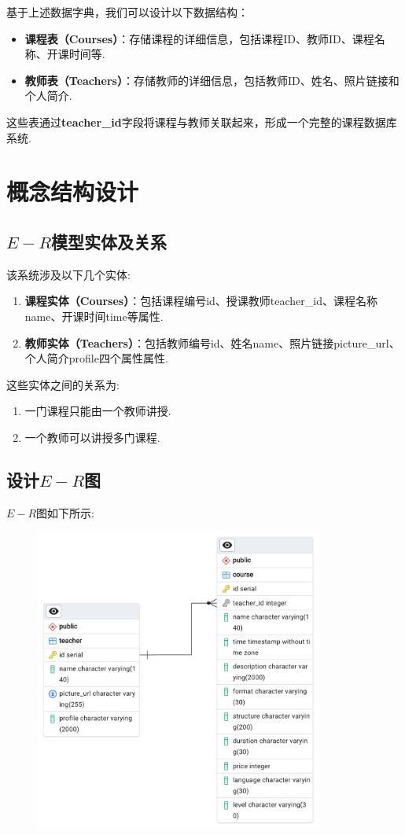 \documentclass[12pt, oneside]{ctexart}
\numberwithin{figure}{section}
\numberwithin{table}{section}
\begin{document}
基于上述数据字典，我们可以设计以下数据结构：
\begin{itemize}
    \item \textbf{课程表（Courses）}：存储课程的详细信息，包括课程ID、教师ID、课程名称、开课时间等.
    \item \textbf{教师表（Teachers）}：存储教师的详细信息，包括教师ID、姓名、照片链接和个人简介.
\end{itemize}

这些表通过\textbf{teacher\_id}字段将课程与教师关联起来，形成一个完整的课程数据库系统.

\section{概念结构设计}

\subsection{$E-R$模型实体及关系}

该系统涉及以下几个实体:
\begin{enumerate}[(1)]
    \item \textbf{课程实体（Courses）}：包括课程编号id、授课教师teacher\_id、课程名称name、开课时间time等属性.
    \item \textbf{教师实体（Teachers）}：包括教师编号id、姓名name、照片链接picture\_url、个人简介profile四个属性属性.
\end{enumerate}
这些实体之间的关系为:
\begin{enumerate}[(1)]
    \item 一门课程只能由一个教师讲授.
    \item 一个教师可以讲授多门课程.
\end{enumerate}

\subsection{设计$E-R$图}

$E-R$图如下所示:
\begin{figure}[!htbp]
    \centering
    \includegraphics[height = 10cm]{images/sec2/ERD.png}
\end{figure}
\end{document}
